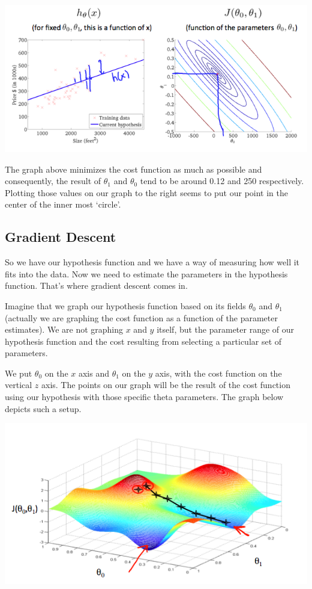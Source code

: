 \documentclass[UTF8]{article}
\begin{document}
\includegraphics[width = .8\textwidth]{NotePics/2_2_2_3.png}

The graph above minimizes the cost function as much as possible and consequently, the result of $\theta_1$ and $\theta_0$ tend to be around 0.12 and 250 respectively. Plotting those values on our graph to the right seems to put our point in the center of the inner most `circle'.

\subsection{Gradient Descent}

So we have our hypothesis function and we have a way of measuring how well it fits into the data. Now we need to estimate the parameters in the hypothesis function. That's where gradient descent comes in.

Imagine that we graph our hypothesis function based on its fields $\theta_0$ and $\theta_1$ (actually we are graphing the cost function as a function of the parameter estimates). We are not graphing $x$ and $y$ itself, but the parameter range of our hypothesis function and the cost resulting from selecting a particular set of parameters.

We put $\theta_0$ on the $x$ axis and $\theta_1$ on the $y$ axis, with the cost function on the vertical $z$ axis. The points on our graph will be the result of the cost function using our hypothesis with those specific theta parameters. The graph below depicts such a setup.

\includegraphics[width = .8\textwidth]{NotePics/2_3_1.png}
\end{document}
